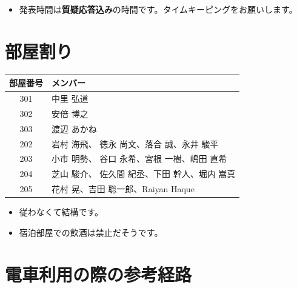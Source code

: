 \documentclass[unicode,a4paper,11pt]{ltjsarticle}
\begin{document}
\begin{itemize}
  \item
        発表時間は\textbf{質疑応答込み}の時間です。タイムキーピングをお願いします。
\end{itemize}

\section{部屋割り}

\begin{center}
  \begin{tabular}{cl}\hline
    部屋番号 & メンバー                                      \\ \hline
    301      & 中里 弘道                                     \\
    302      & 安倍 博之                                     \\
    303      & 渡辺 あかね                                   \\
    202      & 岩村 海飛、 徳永 尚文、落合 誠、永井 駿平     \\
    203      & 小市 明勢、 谷口 永希、宮根 一樹、嶋田 直希   \\
    204      & 芝山 駿介、 佐久間 紀丞、下田 幹人、堀内 嵩真 \\
    205      & 花村 晃、吉田 聡一郎、Raiyan Haque            \\ \hline
  \end{tabular}
\end{center}

\begin{itemize}
  \item
        従わなくて結構です。
  \item
        宿泊部屋での飲酒は禁止だそうです。
\end{itemize}


\section{電車利用の際の参考経路}

\vspace*{5pt}
\end{document}
